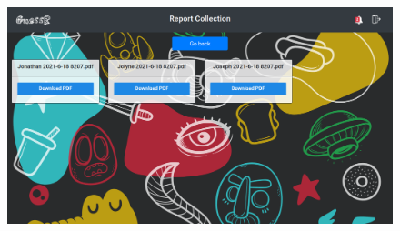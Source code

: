  \begin{figure}[H]
  \centering
  \begin{minipage}[b]{0.73\textwidth}
    \includegraphics[width=\textwidth]{img/screen/previous_reports.png}
  \end{minipage}
  \hspace{1cm}
  \begin{minipage}[b]{0.19\textwidth}

\end{minipage}
\end{figure}
